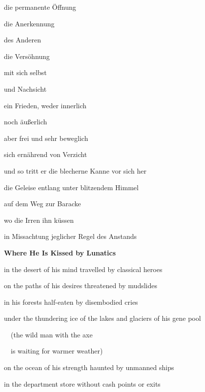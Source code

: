 \documentclass[a4paper]{article}
\begin{document}
die permanente Öffnung

die Anerkennung

des Anderen

die Versöhnung

mit sich selbst

und Nachsicht


\bigskip

ein Frieden, weder innerlich 

noch äußerlich

aber frei und sehr beweglich

sich ernährend von Verzicht


\bigskip


\bigskip


\bigskip

und so tritt er die blecherne Kanne vor sich her

die Geleise entlang unter blitzendem Himmel

auf dem Weg zur Baracke


\bigskip

wo die Irren ihn küssen

in Missachtung jeglicher Regel des Anstands


\bigskip

\clearpage
\bigskip

{\bfseries
Where He Is Kissed by Lunatics}


\bigskip


\bigskip

in the desert of his mind travelled by classical heroes


\bigskip

on the paths of his desires threatened by mudslides


\bigskip

in his forests half-eaten by disembodied cries


\bigskip

under the thundering ice of the lakes and glaciers of his gene pool


\bigskip

\ \  (the wild man with the axe

\ \  is waiting for warmer weather)


\bigskip

on the ocean of his strength haunted by unmanned ships


\bigskip

in the department store without cash points or exits


\bigskip
\end{document}
